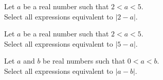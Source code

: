 \documentclass{ximera}
\author{Lee Wayand}
\begin{document}
\begin{exercise}

Let $a$ be a real number such that $2 < a < 5$. \\

Select all expressions equivalent to $|2-a|$. \\


\begin{selectAll}
\end{selectAll}


\end{exercise}









\begin{exercise}

Let $a$ be a real number such that $2 < a < 5$. \\

Select all expressions equivalent to $|5-a|$. \\


\begin{selectAll}
\end{selectAll}


\end{exercise}












\begin{exercise}

Let $a$ and $b$ be real numbers such that $0 < a < b$. \\

Select all expressions equivalent to $|a-b|$. \\


\begin{selectAll}
\end{selectAll}


\end{exercise}
\end{document}
